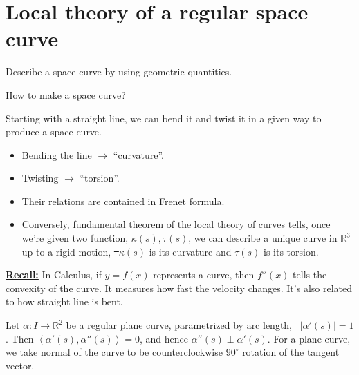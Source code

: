 \section{Local theory of a regular space curve}

\begin{goal}
    Describe a space curve by using geometric quantities.
\end{goal}

\begin{question}
    How to make a space curve? 
\end{question}
Starting with a straight line, we can bend it and twist it in a given way to
produce a space curve.
\begin{itemize}
    \item Bending the line \(\longrightarrow\) ``curvature''.
    \item Twisting \(\longrightarrow\) ``torsion''.
    \item Their relations are contained in Frenet formula.
    \item Conversely, fundamental theorem of the local theory of curves
        tells, once we're given two function, \(\kappa(s),\tau(s)\), we can
        describe a unique curve in \(\mathbb{R}^3\) up to a rigid motion,
        \st\ \(\kappa(s)\) is its curvature and \(\tau(s)\) is its torsion.
\end{itemize}

\noindent\underline{\bf Recall:} In Calculus, if \(y=f(x)\) represents a curve, then
\(f''(x)\) tells the convexity of the curve. It measures how fast the velocity
changes. It's also related to how straight line is bent.


Let \(\alpha\colon I\to \mathbb{R}^2\) be a regular plane curve, parametrized by
arc length, \ie\ \(|\alpha'(s)|=1\). Then \(\left<\alpha'(s),\alpha''(s)\right> =0\),
and hence \(\alpha''(s)\perp\alpha'(s)\). For a plane curve, we take normal of the
curve to be counterclockwise \(90^\circ\) rotation of the tangent vector.

